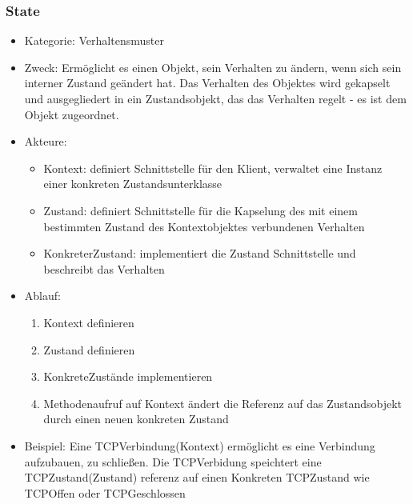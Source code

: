 \documentclass[11pt, fleqn, a4paper, leqno]{scrartcl} %
\begin{document}
		\subsubsection{State}
			\begin{itemize}
				\item Kategorie: Verhaltensmuster
				\item Zweck: Ermöglicht es einen Objekt, sein Verhalten zu ändern, wenn sich sein interner Zustand geändert hat. Das Verhalten des Objektes wird gekapselt und ausgegliedert in ein Zustandsobjekt, das das Verhalten regelt - es ist dem Objekt zugeordnet.
				\item Akteure: 
					\begin{itemize}
						\item Kontext: definiert Schnittstelle für den Klient, verwaltet eine Instanz einer konkreten Zustandsunterklasse
						\item Zustand: definiert Schnittstelle für die Kapselung des mit einem bestimmten Zustand des Kontextobjektes verbundenen Verhalten
						\item KonkreterZustand: implementiert die Zustand Schnittstelle und beschreibt das Verhalten
					\end{itemize}
				\item Ablauf:
					\begin{enumerate}
						\item Kontext definieren
						\item Zustand definieren
						\item KonkreteZustände implementieren
						\item Methodenaufruf auf Kontext ändert die Referenz auf das Zustandsobjekt durch einen neuen konkreten Zustand
					\end{enumerate}
				\item Beispiel: Eine TCPVerbindung(Kontext) ermöglicht es eine Verbindung aufzubauen, zu schließen. Die TCPVerbidung speichtert eine TCPZustand(Zustand) referenz auf einen Konkreten TCPZustand wie TCPOffen oder TCPGeschlossen
			\end{itemize}
\end{document}
